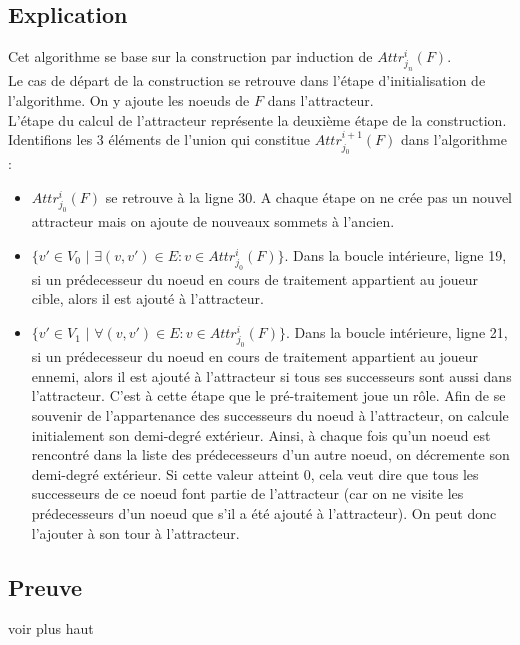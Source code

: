 \documentclass[12pt,a4paper,oneside, titlepage]{report}
\begin{document}
\subsection*{Explication}
Cet algorithme se base sur la construction par induction de $Attr_{j_n}^i(F)$.\\
Le cas de départ de la construction se retrouve dans l'étape d'initialisation de l'algorithme. On y ajoute les noeuds de $F$ dans l'attracteur.\\
L'étape du calcul de l'attracteur représente la deuxième étape de la construction. Identifions les 3 éléments de l'union qui constitue $Attr^{i+1}_{j_0}(F)$ dans l'algorithme :
\begin{itemize}
\item $Attr^i_{j_0}(F)$ se retrouve à la ligne 30. A chaque étape on ne crée pas un nouvel attracteur mais on ajoute de nouveaux sommets à l'ancien.
\item $\{v'\in V_0$ $|$ $\exists(v,v')\in E:v\in Attr^i_{j_0}(F)\}$. Dans la boucle intérieure, ligne 19, si un prédecesseur du noeud en cours de traitement appartient au joueur cible, alors il est ajouté à l'attracteur.
\item $\{v'\in V_1$ $|$ $\forall(v,v')\in E:v\in Attr^i_{j_0}(F)\}$. Dans la boucle intérieure, ligne 21, si un prédecesseur du noeud en cours de traitement appartient au joueur ennemi, alors il est ajouté à l'attracteur si tous ses successeurs sont aussi dans l'attracteur. C'est à cette étape que le pré-traitement joue un rôle. Afin de se souvenir de l'appartenance des successeurs du noeud à l'attracteur, on calcule initialement son demi-degré extérieur. Ainsi, à chaque fois qu'un noeud est rencontré dans la liste des prédecesseurs d'un autre noeud, on décremente son demi-degré extérieur. Si cette valeur atteint $0$, cela veut dire que tous les successeurs de ce noeud font partie de l'attracteur (car on ne visite les prédecesseurs d'un noeud que s'il a été ajouté à l'attracteur). On peut donc l'ajouter à son tour à l'attracteur.
\end{itemize}


\subsection*{Preuve}
voir plus haut
\end{document}
